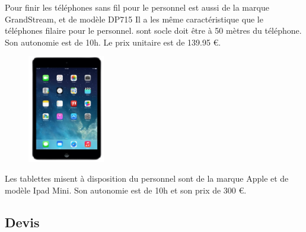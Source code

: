 Pour finir les téléphones sans fil pour le personnel est aussi de la marque GrandStream, et de modèle DP715
Il a les même caractéristique que le téléphones filaire pour le personnel. sont socle doit être à 50 mètres du téléphone.
Son autonomie est de 10h. Le prix unitaire est de 139.95  \euro.


\begin{figure}[!ht]
    \center
    \includegraphics[width=0.3\textwidth]{./images/32.png}
\end{figure}

Les tablettes misent à disposition du personnel sont de la marque Apple et de modèle Ipad Mini. Son autonomie est de 10h et son prix de 300  \euro.




    \clearpage


\subsection{Devis}


